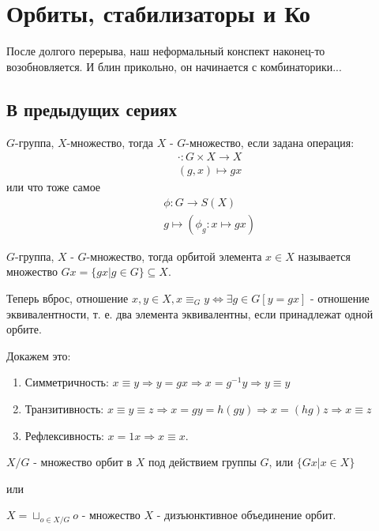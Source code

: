 \chapter{Орбиты, стабилизаторы и Ко}

После долгого перерыва, наш неформальный конспект наконец-то возобновляется.
И блин прикольно, он начинается с комбинаторики...

\section{В предыдущих сериях}

\begin{Def}
$G$-группа, $X$-множество, тогда $X$ - $G$-множество, если задана операция:
\[
	\begin{split}
		& \cdot : G \times X \rightarrow X \\
		& \left(g, x\right) \mapsto gx
	\end{split}
\]
или что тоже самое
\[
	\begin{split}
		& \phi : G \rightarrow S\left(X\right) \\
		& g \mapsto \left(\phi_g : x \mapsto gx\right)
	\end{split}
\]
\end{Def}

\begin{Def}
$G$-группа, $X$ - $G$-множество, тогда орбитой элемента $x \in X$ называется множество $Gx = \lbrace gx | g \in G\rbrace \subseteq X$.
\end{Def}

Теперь вброс, отношение $x,y \in X, x \equiv_G y \Leftrightarrow \exists g \in G \left[y = gx\right]$ - отношение эквивалентности, т. е. два элемента эквивалентны, если принадлежат одной орбите.

Докажем это:

\begin{enumerate}
\item Симметричность: $x \equiv y \Rightarrow y = gx \Rightarrow x = g^{-1}y \Rightarrow y \equiv y$

\item Транзитивность: $x \equiv y \equiv z \Rightarrow x = gy = h\left(gy\right) \Rightarrow x = \left(hg\right)z \Rightarrow x \equiv z$

\item Рефлексивность: $x = 1 x \Rightarrow x \equiv x$.
\end{enumerate}

\begin{Def}
$X / G$ - множество орбит в $X$ под действием группы $G$, или $\lbrace Gx | x \in X\rbrace$

или

$X = \sqcup_{o \in X / G} o$ - множество $X$ - дизъюнктивное объединение орбит.
\end{Def}

